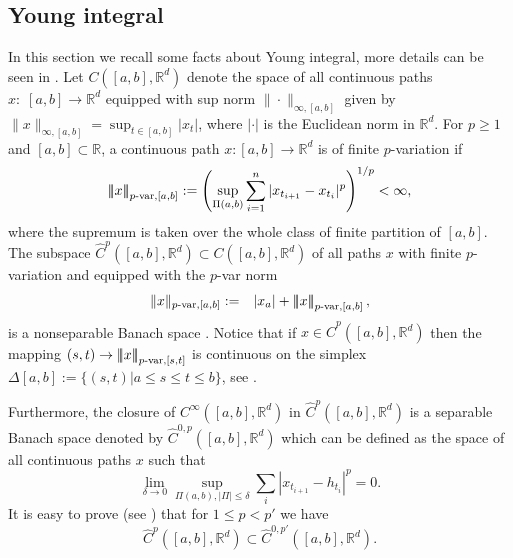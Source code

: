 \documentclass[10pt]{article}
\numberwithin{equation}{section} %
\newcommand{\R}{\ensuremath{\mathbb{R}}}
\newcommand{\ltn}{\ensuremath{\left| \! \left| \! \left|}}
\newcommand{\rtn}{\ensuremath{\right| \! \right| \! \right|}}
\begin{document}
\subsection{Young integral}\label{subsec.frac.int}
In this section we recall some facts about Young integral, more details can be seen in \cite{friz}. Let $C([a,b],\R^d)$ denote the space of all continuous paths $x:\;[a,b] \to \R^d$ equipped with sup norm $\|\cdot\|_{\infty,[a,b]}$ given by $\|x\|_{\infty,[a,b]}=\sup_{t\in [a,b]} |x_t|$, where $|\cdot|$ is the Euclidean norm in $\R^d$. For $p\geq 1$ and $[a,b] \subset \R$, a continuous path $x:[a,b] \to \R^d$ is of finite $p$-variation if 
\begin{eqnarray}
\ltn x\rtn_{p\text{-var},[a,b]} :=\left(\sup_{\Pi(a,b)}\sum_{i=1}^n|x_{t_{i+1}}-x_{t_i}|^p\right)^{1/p} < \infty,
\end{eqnarray}
where the supremum is taken over the whole class of finite partition of $[a,b]$. The subspace $\widehat{C}^p([a,b],\R^d)\subset C([a,b],\R^d)$ of all paths  $x$ with finite $p$-variation and equipped with the $p$-var norm
\begin{eqnarray*}
	\|x\|_{p\text{-var},[a,b]}&:=& |x_a|+\ltn x\rtn_{p\text{-var},[a,b]},
\end{eqnarray*}
is a nonseparable Banach space \cite[Theorem 5.25, p.\ 92]{friz}. Notice that if $x\in \widehat{C}^p([a,b],\R^d) $ then the mapping $(s,t)\to \ltn x\rtn_{p\text{-var},[s,t]}$ is continuous on the simplex $\Delta[a,b]:=\{(s,t)|a\leq s\leq t\leq b\}$, see \cite[Proposition 5.8, p. 80]{friz}. 

Furthermore, the closure of $C^\infty([a,b],\R^d)$ in $\widehat{C}^p([a,b],\R^d)$ is a separable Banach space denoted by  $\widehat{C}^{0,p}([a,b],\R^d)$ which can be defined as the space of all continuous paths $x$ such that
\[
\lim \limits_{\delta \to 0} \sup_{\Pi(a,b), |\Pi| \leq \delta} \sum_i |x_{t_{i+1}}-h_{t_i}|^p =0.
\]
It is easy to prove (see \cite[Corollary 5.33, p. 98]{friz}) that for $1\leq p< p'$ we have
\[
\widehat{C}^p([a,b],\R^d)\subset \widehat{C}^{0,p'}([a,b],\R^d).
\]
\end{document}
